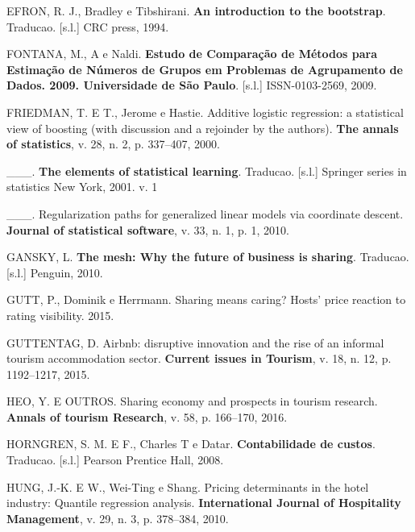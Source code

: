 \documentclass[
	12pt,				%
	a4paper,		%
	oneside,    %
	chapter=TITLE,		   %
	section=TITLE,		   %
	subsection=TITLE,	   %
	subsubsection=TITLE, %
	english,			%
	french,				%
	spanish,			%
	brazil,				%
]{abntex2}
\begin{document}
\leavevmode\hypertarget{ref-efron1994introduction}{}%
EFRON, R. J., Bradley e Tibshirani. \textbf{An introduction to the
bootstrap}. Traducao. {[}s.l.{]} CRC press, 1994.

\leavevmode\hypertarget{ref-fontanaestudo}{}%
FONTANA, M., A e Naldi. \textbf{Estudo de Comparação de Métodos para
Estimação de Números de Grupos em Problemas de Agrupamento de Dados.
2009. Universidade de São Paulo}. {[}s.l.{]} ISSN-0103-2569, 2009.

\leavevmode\hypertarget{ref-friedman2000additive}{}%
FRIEDMAN, T. E T., Jerome e Hastie. Additive logistic regression: a
statistical view of boosting (with discussion and a rejoinder by the
authors). \textbf{The annals of statistics}, v. 28, n. 2, p. 337--407,
2000.

\leavevmode\hypertarget{ref-friedman2001elements}{}%
\_\_\_. \textbf{The elements of statistical learning}. Traducao.
{[}s.l.{]} Springer series in statistics New York, 2001. v. 1

\leavevmode\hypertarget{ref-friedman2010regularization}{}%
\_\_\_. Regularization paths for generalized linear models via
coordinate descent. \textbf{Journal of statistical software}, v. 33, n.
1, p. 1, 2010.

\leavevmode\hypertarget{ref-gansky2010mesh}{}%
GANSKY, L. \textbf{The mesh: Why the future of business is sharing}.
Traducao. {[}s.l.{]} Penguin, 2010.

\leavevmode\hypertarget{ref-gutt2015sharing}{}%
GUTT, P., Dominik e Herrmann. Sharing means caring? Hosts' price
reaction to rating visibility. 2015.

\leavevmode\hypertarget{ref-guttentag2015airbnb}{}%
GUTTENTAG, D. Airbnb: disruptive innovation and the rise of an informal
tourism accommodation sector. \textbf{Current issues in Tourism}, v. 18,
n. 12, p. 1192--1217, 2015.

\leavevmode\hypertarget{ref-heo2016sharing}{}%
HEO, Y. E OUTROS. Sharing economy and prospects in tourism research.
\textbf{Annals of tourism Research}, v. 58, p. 166--170, 2016.

\leavevmode\hypertarget{ref-horngren2008contabilidade}{}%
HORNGREN, S. M. E F., Charles T e Datar. \textbf{Contabilidade de
custos}. Traducao. {[}s.l.{]} Pearson Prentice Hall, 2008.

\leavevmode\hypertarget{ref-hung2010pricing}{}%
HUNG, J.-K. E W., Wei-Ting e Shang. Pricing determinants in the hotel
industry: Quantile regression analysis. \textbf{International Journal of
Hospitality Management}, v. 29, n. 3, p. 378--384, 2010.
\end{document}
